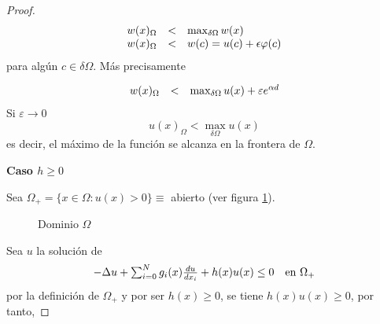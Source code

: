 \begin{proof}
\begin{equation*}
\begin{array}{l l l}
w(x)_\Omega & < & \max_{\delta\Omega} w(x) \\
w(x)_\Omega & < &  w(c) = u(c) + \epsilon\varphi(c)
\end{array}
\end{equation*}
para algún $c\in\delta\Omega$. Más precisamente

\begin{equation*}
\begin{array}{l l l}
w(x)_\Omega & < & \max_{\delta\Omega}u(x) + \varepsilon e^{\alpha d}
\end{array}
\end{equation*}
Si $\varepsilon\to0$
$$u(x)_\Omega < \max_{\delta\Omega}u(x)$$
es decir, el máximo de la función se alcanza en la frontera de $\Omega$.

\noindent\textbf{Caso $h \ge 0$}

Sea $\Omega_+ = \{x\in \Omega: u(x) > 0\} \equiv$ abierto (ver figura \ref{fig:omega-mas}).

\begin{figure}[ht]
\centering
{}
\caption{Dominio $\Omega$}
\label{fig:omega-mas}
\end{figure}

\noindent Sea $u$ la solución de 
\begin{equation*}
\begin{array}{l l}
-\Delta u + \sum_{i=0}^Ng_i(x)\frac{du}{dx_i} + h(x)u(x)\le0 & \text{en } \Omega_+
\end{array}
\end{equation*}
por la definición de $\Omega_+$ y por ser $h(x) \ge 0$, se tiene $h(x)u(x) \ge 0$, por tanto, 


\end{proof}
